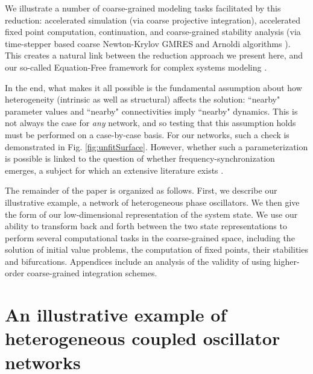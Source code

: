 \documentclass[numbers]{frontiersSCNS}
\newcommand{\figRef}[1]{Fig. \ref{fig:#1}}
\begin{document}
We illustrate a number of coarse-grained modeling tasks facilitated by this reduction: accelerated simulation
(via coarse projective integration), accelerated fixed point computation, continuation, and coarse-grained stability
analysis (via time-stepper based coarse Newton-Krylov GMRES \cite{Kelley1995,Kelley2003}
and Arnoldi algorithms \cite{Saad2011}%
).
%
This creates a natural link between the reduction approach we present here,
and our so-called Equation-Free framework for complex systems modeling
\cite{Kevrekidis2003,Kevrekidis2004}.


In the end, what makes it all possible is the fundamental assumption about how heterogeneity (intrinsic as well as structural)
affects the solution: ``nearby" parameter values and ``nearby" connectivities imply ``nearby" dynamics.
%
This is not always the case for {\em any} network, and so testing that this assumption holds
must be performed on a case-by-case basis.
%
For our networks, such a check is demonstrated in \figRef{unfitSurface}.
%
However, whether such a parameterization is possible
is linked to the question of whether frequency-synchronization emerges,
a subject for which an extensive literature exists \cite{Dorfler2014}.


The remainder of the paper is organized as follows.
%
First, we describe our illustrative example, a network of heterogeneous phase oscillators.
%
We then give the form of our low-dimensional representation of the system state.
%
We use our ability to transform back and forth between the two state representations
to perform several computational tasks in the coarse-grained space,
including the solution of initial value problems,
the computation of fixed points, their stabilities and bifurcations.
%
Appendices include an analysis of the validity of using higher-order coarse-grained integration schemes.


\section{An illustrative example of heterogeneous coupled oscillator networks}
\label{sec:exampleProblemSetup}
\end{document}
